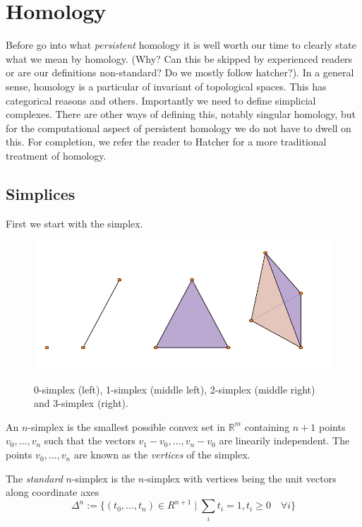 \chapter{Homology}
Before go into what \textit{persistent} homology it is well worth our time to clearly state what we mean by homology. (Why? Can this be skipped by experienced readers or are our definitions non-standard? Do we mostly follow hatcher?). In a general sense, homology is a particular of invariant of topological spaces. This has categorical reasons and others.
Importantly we need to define simplicial complexes. There are other ways of defining this, notably singular homology, but for the computational aspect of persistent homology we do not have to dwell on this. For completion, we refer the reader to Hatcher for a more traditional treatment of homology.

\section{Simplices}
First we start with the simplex.

\begin{figure}
  \centering
  \includegraphics[]{simplex.pdf}
  \label{simplices}
  \caption{0-simplex (left), 1-simplex (middle left), 2-simplex (middle right) and 3-simplex (right).}
  \end{figure}
\begin{definition}
An $n$-simplex is the smallest possible convex set in $\mathbb{R}^{m}$ containing $n+1$ points $v_{0},\dots,v_{n}$ such that the vectors $v_{1}-v_{0}, \dots, v_{n} - v_{0}$ are linearily independent. The points $v_{0},\dots,v_{n}$ are known as the \textit{vertices} of the simplex.
\end{definition}
\begin{definition}
The \textit{standard} $n$-simplex is the $n$-simplex with vertices being the unit vectors along coordinate axes
\[ \Delta^{n} := \{ (t_{0}, \dots, t_{n}) \in R^{n+1} \mid \sum_{i} t_{i} = 1, t_{i} \geq 0 \quad \forall i \}
\]
\end{definition}

